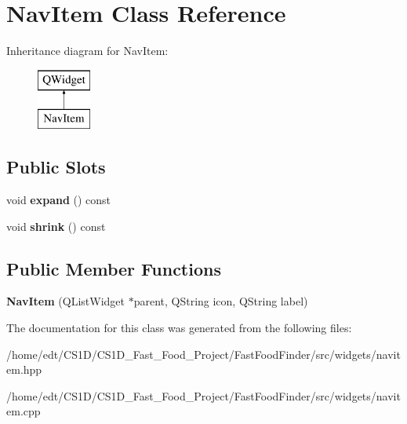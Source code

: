 \hypertarget{classNavItem}{\section{Nav\-Item Class Reference}
\label{classNavItem}
}
Inheritance diagram for Nav\-Item\-:\begin{figure}[H]
\begin{center}
\leavevmode
\includegraphics[height=2.000000cm]{classNavItem}
\end{center}
\end{figure}
\subsection*{Public Slots}
\begin{DoxyCompactItemize}
\item 
\hypertarget{classNavItem_af2b4677feec75195fa3dd0c44000d9cc}{void {\bfseries expand} () const }\label{classNavItem_af2b4677feec75195fa3dd0c44000d9cc}

\item 
\hypertarget{classNavItem_ada27101daf46eec0e5c56c5618b03c2a}{void {\bfseries shrink} () const }\label{classNavItem_ada27101daf46eec0e5c56c5618b03c2a}

\end{DoxyCompactItemize}
\subsection*{Public Member Functions}
\begin{DoxyCompactItemize}
\item 
\hypertarget{classNavItem_a2639e9b7df2859d0471d95192312d17b}{{\bfseries Nav\-Item} (Q\-List\-Widget $\ast$parent, Q\-String icon, Q\-String label)}\label{classNavItem_a2639e9b7df2859d0471d95192312d17b}

\end{DoxyCompactItemize}


The documentation for this class was generated from the following files\-:\begin{DoxyCompactItemize}
\item 
/home/edt/\-C\-S1\-D/\-C\-S1\-D\-\_\-\-Fast\-\_\-\-Food\-\_\-\-Project/\-Fast\-Food\-Finder/src/widgets/navitem.\-hpp\item 
/home/edt/\-C\-S1\-D/\-C\-S1\-D\-\_\-\-Fast\-\_\-\-Food\-\_\-\-Project/\-Fast\-Food\-Finder/src/widgets/navitem.\-cpp\end{DoxyCompactItemize}
